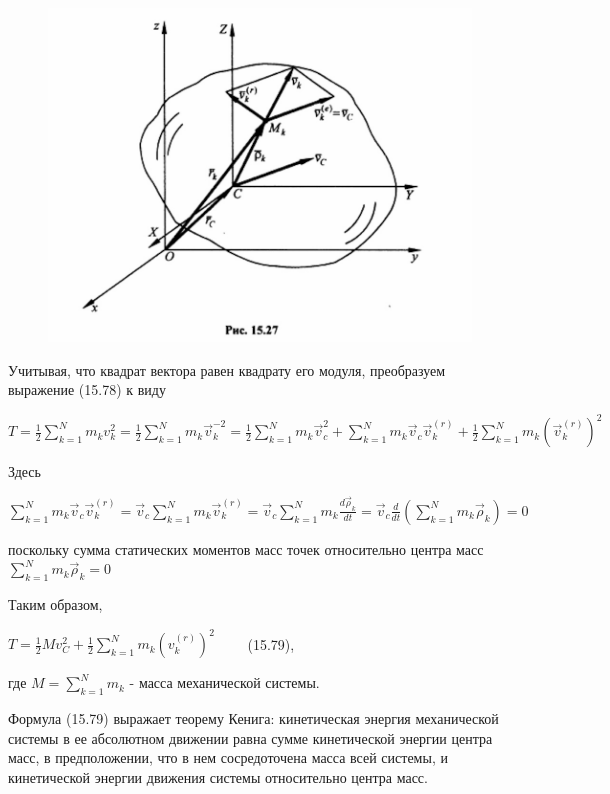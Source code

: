 {\begin{center}
\begin{figure}[H]
        \centering\includegraphics[scale=0.25]{img/15.27.jpeg} 
    \end{figure}
    \par Учитывая, что квадрат вектора равен квадрату его модуля, преобразуем выражение (15.78) к виду 
    \par $T = \frac{1}{2} \sum_{k=1}^N {m_k v_k^2} = \frac{1}{2} \sum_{k=1}^N {m_k \vec{v}_k^{-2}} =  \frac{1}{2} \sum_{k=1}^N {m_k \vec{v}_c^2} + \sum_{k=1}^N {m_k \vec{v}_c \vec{v}_k^{(r)}} + \frac{1}{2} \sum_{k=1}^N {m_k (\vec{v}_k^{(r)})^2} $
    \par Здесь 
    \par $\sum_{k=1}^N {m_k \vec{v}_c \vec{v}_k^{(r)}} = \vec{v}_c \sum_{k=1}^N {m_k \vec{v}_k^{(r)}} = \vec{v}_c \sum_{k=1}^N {m_k \frac{d \vec{\rho}_k}{dt}} = \vec{v}_c \frac{d}{dt}(\sum_{k=1}^N {m_k \vec{\rho}_k}) = 0 $
    \par поскольку сумма статических моментов масс точек относительно центра масс $\sum_{k=1}^N {m_k \vec{\rho}_k=0} $
    \par Таким образом, 
    \par $ T= \frac{1}{2} M v_C^2 + \frac{1}{2} \sum_{k=1}^N{m_k (v_k^{(r)})^2} \qquad$ (15.79),
    \par где  $ M= \sum_{k=1}^N {m_k} $ - масса механической системы.
    \par Формула (15.79) выражает теорему Кенига: кинетическая энергия механической системы в ее абсолютном движении равна сумме кинетической энергии центра масс, в предположении, что в нем сосредоточена масса всей системы, и кинетической энергии движения системы относительно центра масс.
\end{center}
}
